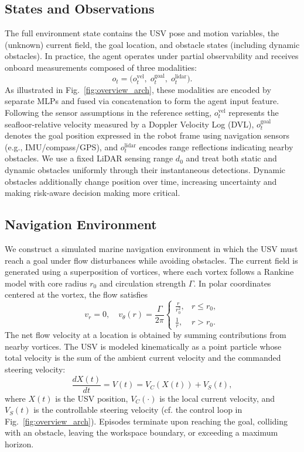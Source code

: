 \subsection{States and Observations}
\label{sec:method_obs}
The full environment state contains the USV pose and motion variables, the (unknown) current field, the goal location, and obstacle states (including dynamic obstacles). In practice, the agent operates under partial observability and receives onboard measurements composed of three modalities:
\begin{equation}
o_t = \big(o^{\mathrm{vel}}_t,\; o^{\mathrm{goal}}_t,\; o^{\mathrm{lidar}}_t\big).
\label{eq:obs}
\end{equation}
As illustrated in Fig.~\ref{fig:overview_arch}, these modalities are encoded by separate MLPs and fused via concatenation to form the agent input feature.
Following the sensor assumptions in the reference setting, $o^{\mathrm{vel}}_t$ represents the seafloor-relative velocity measured by a Doppler Velocity Log (DVL), $o^{\mathrm{goal}}_t$ denotes the goal position expressed in the robot frame using navigation sensors (e.g., IMU/compass/GPS), and $o^{\mathrm{lidar}}_t$ encodes range reflections indicating nearby obstacles. We use a fixed LiDAR sensing range $d_0$ and treat both static and dynamic obstacles uniformly through their instantaneous detections. Dynamic obstacles additionally change position over time, increasing uncertainty and making risk-aware decision making more critical.

\subsection{Navigation Environment}
\label{sec:method_env}
We construct a simulated marine navigation environment in which the USV must reach a goal under flow disturbances while avoiding obstacles. The current field is generated using a superposition of vortices, where each vortex follows a Rankine model with core radius $r_0$ and circulation strength $\Gamma$. In polar coordinates centered at the vortex, the flow satisfies
\begin{equation}
v_r = 0,\quad
v_{\theta}(r)=\frac{\Gamma}{2\pi}
\begin{cases}
\frac{r}{r_0^2}, & r \le r_0,\\
\frac{1}{r}, & r > r_0.
\end{cases}
\label{eq:rankine}
\end{equation}
The net flow velocity at a location is obtained by summing contributions from nearby vortices. The USV is modeled kinematically as a point particle whose total velocity is the sum of the ambient current velocity and the commanded steering velocity:
\begin{equation}
\frac{dX(t)}{dt}=V(t)=V_C(X(t)) + V_S(t),
\label{eq:kinematics}
\end{equation}
where $X(t)$ is the USV position, $V_C(\cdot)$ is the local current velocity, and $V_S(t)$ is the controllable steering velocity (cf. the control loop in Fig.~\ref{fig:overview_arch}).
Episodes terminate upon reaching the goal, colliding with an obstacle, leaving the workspace boundary, or exceeding a maximum horizon.

